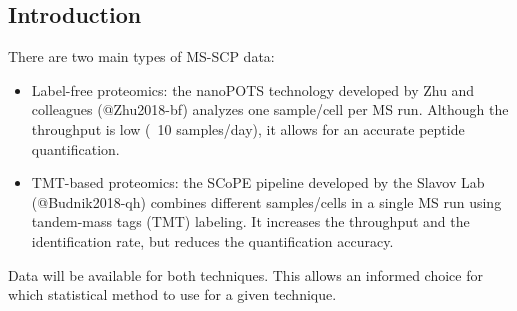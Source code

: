 \documentclass{article}
\begin{document}

\setlength{\columnsep}{1cm}
\begin{multicols}{2}

\noindent
{}


\section*{Introduction}

There are two main types of MS-SCP data:

\begin{itemize}
  \item Label-free proteomics: the nanoPOTS technology developed by Zhu and colleagues (@Zhu2018-bf) analyzes one sample/cell per MS run. Although the throughput is low (~10 samples/day), it allows for an accurate peptide quantification. 
  \item TMT-based proteomics: the SCoPE pipeline developed by the Slavov Lab (@Budnik2018-qh) combines different samples/cells in a single MS run using tandem-mass tags (TMT) labeling. It increases the throughput and the identification rate, but reduces the quantification accuracy.
\end{itemize}

Data will be available for both techniques. This allows an informed choice for which statistical method to use for a given technique.



\end{multicols}
\end{document}
